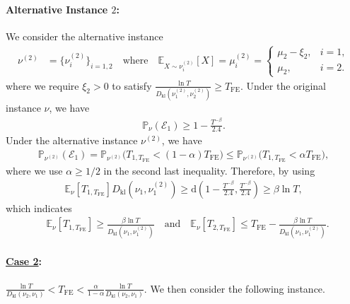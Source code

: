 \documentclass[twoside,11pt]{article}
\newcommand{\kl}{D_{\mathrm{kl}}}
\newcommand{\calE}{\mathcal{E}}
\newcommand{\calN}{\mathcal{N}}
\newcommand{\rmd}{\mathrm{d}}
\newcommand{\bbE}{\mathbb{E}}
\newcommand{\bbP}{\mathbb{P}}
\newcommand{\Tfe}{T_{\mathrm{FE}}}
\begin{document}
\paragraph{Alternative Instance $2$:}
We consider the alternative instance 
\begin{align}
\nu^{(2)} 
&= \big\{ \nu_i^{(2)} \big\}_{i=1,2} 
\quad\text{where}\quad \bbE_{X\sim \nu_i^{(2)}}[X]=
\mu_i^{(2)} =
\begin{cases}
\mu_2 - \xi_2, & i = 1, \\
\mu_2, & i = 2.
\end{cases}
\end{align}
where we require $\xi_2>0$ to satisfy $\frac{\ln T}{\kl(\nu_1^{(2)},\nu_2^{(2)})}\geq \Tfe$.
Under the original instance $\nu$, we have
\begin{align}
    \bbP_\nu (\calE_1) 
    \geq 1 -\frac{T^{-\beta}}{2.4}.
\end{align}
Under the alternative instance $\nu^{(2)}$, we have 
\begin{align}
    \bbP_{\nu^{(2)}} (\calE_1) 
    = \bbP_{\nu^{(2)}} \big(T_{1,\Tfe}<(1-\alpha)\Tfe\big) 
    \leq 
    \bbP_{\nu^{(2)}} \big(T_{1,\Tfe}<\alpha\Tfe\big),
\end{align}
where we use 
$\alpha\geq 1/2$ in the second last inequality.
Therefore, by using~\citet[Lemma~1]{kaufmann2016complexity}
\begin{align}
    \bbE_{\nu}[T_{1,\Tfe}] \kl(\nu_1,\nu_1^{(2)}) \geq \rmd \left(1-\frac{T^{-\beta}}{2.4}, \frac{T^{-\beta}}{2.4} \right)
    \geq \beta\ln T,
\end{align}
which indicates
\begin{align}
    &\bbE_{\nu}[T_{1,\Tfe}]
    \geq 
     \frac{\beta \ln T}{\kl(\nu_1,\nu_1^{(2)})}
     \quad\mbox{and}\quad
     \bbE_{\nu}[T_{2,\Tfe}]
    \leq 
    \Tfe-\frac{\beta \ln T}{\kl(\nu_1,\nu_1^{(2)})}.
\end{align}


\paragraph{\textbf{\underline{Case 2}}:}  $\frac{\ln T}{\kl(\nu_2,\nu_1)}<\Tfe<\frac{\alpha}{1-\alpha} \frac{\ln T}{\kl(\nu_2,\nu_1)}.$
We then consider the following instance.
\end{document}
